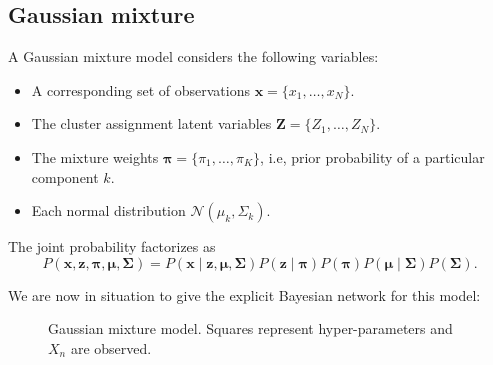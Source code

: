 \documentclass[11pt]{article}
\theoremstyle{definition}
\begin{document}
\subsection{Gaussian mixture}

A Gaussian mixture model considers the following variables:

\begin{itemize}\setlength\itemsep{1em}
  \item A corresponding set of observations \(\bm{x} = \{x_{1},\dots, x_{N}\}\).
  \item The cluster assignment latent variables \(\bm{Z} = \{Z_{1}, \dots, Z_{N}\}\).
  \item The mixture weights \(\bm{\pi} = \{\pi_{1},\dots,\pi_{K}\}\), i.e, prior probability of a particular component \(k\).
  \item Each normal distribution \(\mathcal{N}(\mu_{k}, \Sigma_{k})\).
\end{itemize}

The joint probability factorizes as
\[
  P(\bm{x}, \bm{z}, \bm{\pi}, \bm{\mu}, \bm{\Sigma}) = P(\bm{x}\mid \bm{z}, \bm{\mu}, \bm{\Sigma})P(\bm{z}\mid \bm{\pi})P(\bm{\pi})P(\bm{\mu}\mid \bm{\Sigma})P(\bm{\Sigma}).
\]

We are now in situation to give the explicit Bayesian network for this model:

\begin{figure}[h!]
  \centering
  \caption{Gaussian mixture model. Squares represent hyper-parameters and \(X_{n}\) are observed. }\label{fig:gaussian_mixture}
\end{figure}
\end{document}
